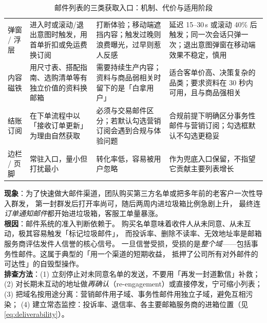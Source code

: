 \begin{table}[htbp]
\centering
\caption{邮件列表的三类获取入口：机制、代价与适用阶段}
\label{tab:listbuild}
\small
\begin{tabularx}{\textwidth}{L{2.0cm} L{3.2cm} L{3.4cm} Y}
\toprule
{} &  &  &  \\
\midrule
弹窗 / 浮层 & 进入时或滚动/退出意图时触发，用首单折扣或免运费换订阅 & 打断体验；移动端遮挡内容；触发过晚则浪费曝光，过早则惹人反感 & 延迟 15--30\,s 或滚动 40\% 后触发；同一次会话只弹一次；退出意图弹窗在移动端效果不稳定，慎用 \\
\addlinespace
内容磁铁 & 用尺寸表、搭配指南、选购清单等有独立价值的资料换邮箱 & 需要持续生产内容；资料与商品弱相关时留下的是「白拿用户」 & 适合客单价高、决策复杂的品类；要求资料在 30 秒内可用，且与商品强相关 \\
\addlinespace
结账订阅 & 在下单流程中以「接收订单更新」为理由自然获取 & 必须与交易邮件区分；若默认勾选营销订阅会遇到合规与体验问题 & 合规前提下明确区分事务性邮件与营销订阅；勾选框默认不勾选更稳妥 \\
\addlinespace
边栏 / 页脚 & 常驻入口，量小但打扰最小 & 转化率低，容易被用户忽略 & 作为兜底入口保留，不指望它贡献主要列表增长 \\
\bottomrule
\end{tabularx}
\end{table}

\begin{pitfall}
\textbf{现象}：为了快速做大邮件渠道，团队购买第三方名单或把多年前的老客户一次性导入群发，
第一封群发后打开率尚可，随后两周内进垃圾箱比例急剧上升，
最终连\emph{订单通知邮件}都开始进垃圾箱，客服工单量暴涨。\\
\textbf{根因}：邮件系统的准入判断依赖于。
购买名单意味着收件人从未同意、从未互动，极其容易触发「标记垃圾邮件」，
而投诉率、删除不读率、无效地址率是邮箱服务商评估发件人信誉的核心信号。
一旦信誉受损，受损的是\emph{整个域}——包括事务性邮件。这属于典型的「用一个渠道的短期收益，
抵押了公司所有对外邮件的可达性」的自毁型操作。\\
\textbf{排查方法}：(1) 立刻停止对未同意名单的发送，不要用「再发一封道歉信」补救；
(2) 对长期未互动的地址做\emph{再确认}（re-engagement）或直接停发，宁可缩小列表；
(3) 把域名按用途分离：营销邮件用子域、事务性邮件用独立子域，避免互相污染；
(4) 建立常态监控：投诉率、退信率、各主要邮箱服务商的进箱位置（见 \cref{eq:deliverability}）。
\end{pitfall}

